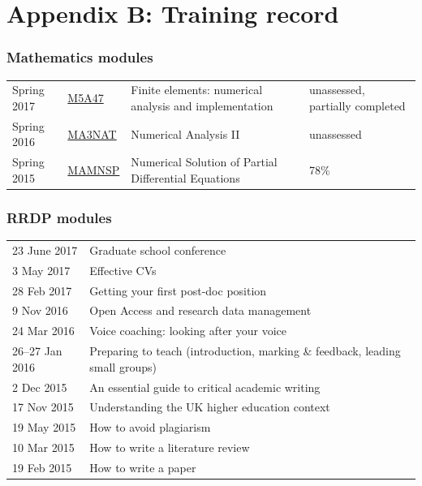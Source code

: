 \documentclass[a4paper,11pt]{article}
\begin{document}
\newpage

\section*{Appendix B: Training record}

\subsubsection*{Mathematics modules}
\begin{tabular}{l l l l}
Spring 2017	& \href{https://finite-element.github.io}{M5A47}  & Finite elements: numerical analysis and implementation & unassessed, partially completed \\
Spring 2016	& \href{www.reading.ac.uk/module/document.aspx?modP=MA3NAT&modYR=1516}{MA3NAT} & Numerical Analysis II & unassessed \\
Spring 2015	& \href{www.reading.ac.uk/modules/document.aspx?modP=MAMNSP&modYR=1415}{MAMNSP} & Numerical Solution of Partial Differential Equations  & 78\% \\
\end{tabular}

\subsubsection*{RRDP modules}
\begin{tabular}{l l}
23 June 2017    & Graduate school conference \\
3 May 2017	& Effective CVs \\
28 Feb 2017	& Getting your first post-doc position \\
9 Nov 2016      & Open Access and research data management \\
24 Mar 2016	& Voice coaching: looking after your voice \\
26--27 Jan 2016 & Preparing to teach (introduction, marking \& feedback, leading small groups) \\
2 Dec 2015	& An essential guide to critical academic writing \\
17 Nov 2015	& Understanding the UK higher education context \\
19 May 2015	& How to avoid plagiarism \\
10 Mar 2015	& How to write a literature review \\
19 Feb 2015	& How to write a paper \\
\end{tabular}
\end{document}
